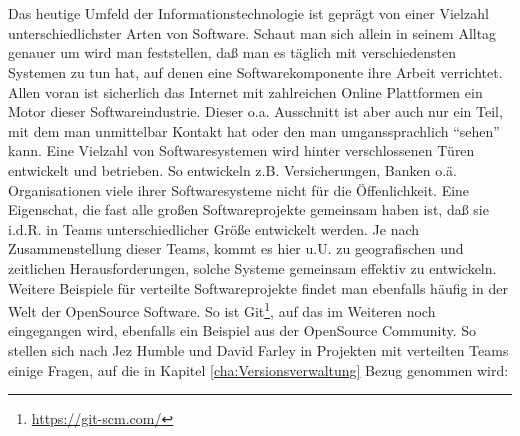 \chapter{\preamble}
\label{cha:preamble}
Das heutige Umfeld der Informationstechnologie ist gepr\"agt von einer Vielzahl
unterschiedlichster Arten von Software. Schaut man sich allein in seinem Alltag
genauer um wird man feststellen, daß man es täglich mit verschiedensten
Systemen zu tun hat, auf denen eine Softwarekomponente ihre Arbeit verrichtet.
Allen voran ist sicherlich das Internet mit zahlreichen Online Plattformen ein
Motor dieser Softwareindustrie. Dieser o.a. Ausschnitt ist aber auch nur ein
Teil, mit dem man unmittelbar Kontakt hat oder den man umganssprachlich
"`sehen"' kann.  Eine Vielzahl von Softwaresystemen wird hinter verschlossenen
T\"uren entwickelt und betrieben. So entwickeln z.B.  Versicherungen, Banken
o.\"a.  Organisationen viele ihrer Softwaresysteme nicht f\"ur die
\"Offenlichkeit. Eine Eigenschat, die fast alle gro\ss{}en Softwareprojekte
gemeinsam haben ist, daß sie i.d.R. in Teams unterschiedlicher Gr\"o\ss{}e
entwickelt werden. Je nach Zusammenstellung dieser Teams, kommt es hier u.U. zu
geografischen und zeitlichen Herausforderungen, solche Systeme gemeinsam
effektiv zu entwickeln.  Weitere Beispiele f\"ur verteilte Softwareprojekte
findet man ebenfalls h\"aufig in der Welt der \gls{OpenSource} Software. So ist
Git\footnote{\label{git:1}\url{https://git-scm.com/}}, auf das im Weiteren noch
eingegangen wird, ebenfalls ein Beispiel aus der \gls{OpenSource} Community. So
stellen sich nach Jez Humble und David Farley in Projekten mit verteilten Teams
einige Fragen, auf die in Kapitel \ref{cha:Versionsverwaltung} Bezug genommen
wird\cite[S.~26, 33]{cd}:
